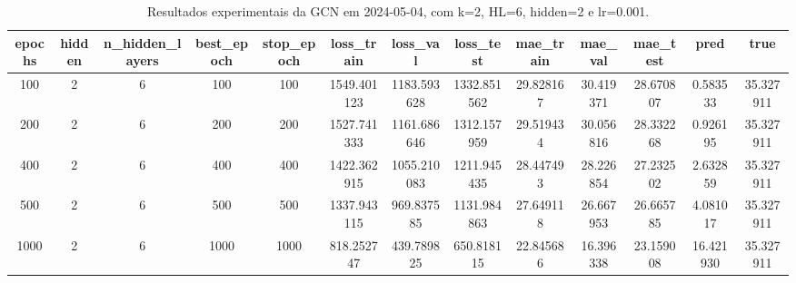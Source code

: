\begin{table}[h]
\centering
\caption{Resultados experimentais da GCN em 2024-05-04, com k=2, HL=6, hidden=2 e lr=0.001.}
\label{tab:gcn_results_k2_hl6_h2_d20240504}
\begin{tabular}{ccccccccccccc}
\toprule
epochs & hidden & n\_hidden\_layers & best\_epoch & stop\_epoch & loss\_train & loss\_val & loss\_test & mae\_train & mae\_val & mae\_test & pred & true \\
\midrule
100 & 2 & 6 & 100 & 100 & 1549.401123 & 1183.593628 & 1332.851562 & 29.828167 & 30.419371 & 28.670807 & 0.583533 & 35.327911 \\
200 & 2 & 6 & 200 & 200 & 1527.741333 & 1161.686646 & 1312.157959 & 29.519434 & 30.056816 & 28.332268 & 0.926195 & 35.327911 \\
400 & 2 & 6 & 400 & 400 & 1422.362915 & 1055.210083 & 1211.945435 & 28.447493 & 28.226854 & 27.232502 & 2.632859 & 35.327911 \\
500 & 2 & 6 & 500 & 500 & 1337.943115 & 969.837585 & 1131.984863 & 27.649118 & 26.667953 & 26.665785 & 4.081017 & 35.327911 \\
1000 & 2 & 6 & 1000 & 1000 & 818.252747 & 439.789825 & 650.818115 & 22.845686 & 16.396338 & 23.159008 & 16.421930 & 35.327911 \\
\bottomrule
\end{tabular}
\end{table}
